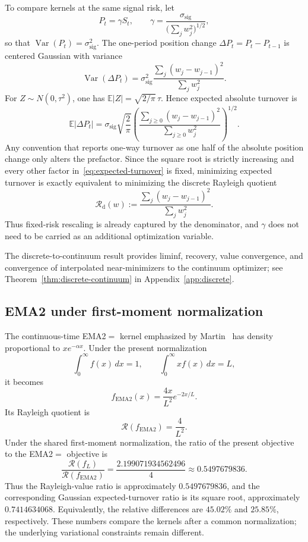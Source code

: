 \documentclass[11pt]{amsart}
\theoremstyle{definition}
\theoremstyle{remark}
\newcommand{\Rcal}{\mathcal R}
\begin{document}
To compare kernels at the same signal risk, let
\[
 P_t=\gamma S_t,
 \qquad
 \gamma=\frac{\sigma_{\mathrm{sig}}}
 {\bigl(\sum_jw_j^2\bigr)^{1/2}},
\]
so that $\operatorname{Var}(P_t)=\sigma_{\mathrm{sig}}^2$. The one-period
position change $\Delta P_t=P_t-P_{t-1}$ is centered Gaussian with variance
\[
 \operatorname{Var}(\Delta P_t)
 =\sigma_{\mathrm{sig}}^2
 \frac{\sum_j(w_j-w_{j-1})^2}{\sum_jw_j^2}.
\]
For $Z\sim N(0,\tau^2)$, one has
$\mathbb E|Z|=\sqrt{2/\pi}\,\tau$. Hence expected absolute turnover is
\begin{equation}\label{eq:expected-turnover}
 \mathbb E|\Delta P_t|
 =\sigma_{\mathrm{sig}}\sqrt{\frac{2}{\pi}}
 \left(
 \frac{\sum_{j\geq0}(w_j-w_{j-1})^2}
      {\sum_{j\geq0}w_j^2}
 \right)^{1/2}.
\end{equation}
Any convention that reports one-way turnover as one half of the absolute
position change only alters the prefactor. Since the square root is strictly
increasing and every other factor in~\eqref{eq:expected-turnover} is fixed,
minimizing expected turnover is exactly equivalent to minimizing the discrete
Rayleigh quotient
\[
 \Rcal_{\mathrm d}(w)
 :=\frac{\sum_j(w_j-w_{j-1})^2}{\sum_jw_j^2}.
\]
Thus fixed-risk rescaling is already captured by the denominator, and $\gamma$
does not need to be carried as an additional optimization variable.

The discrete-to-continuum result provides liminf, recovery, value convergence,
and convergence of interpolated near-minimizers to the continuum optimizer; see
Theorem~\ref{thm:discrete-continuum} in Appendix~\ref{app:discrete}.

\subsection{EMA2 under first-moment normalization}
The continuous-time EMA2$=$ kernel emphasized by Martin~\cite{Martin2021} has
density proportional to $x e^{-\alpha x}$. Under the present normalization
\[
\int_0^\infty f(x)\,dx=1,
\qquad
\int_0^\infty x f(x)\,dx=L,
\]
it becomes
\[
 f_{\mathrm{EMA2}}(x)=\frac{4x}{L^2}e^{-2x/L}.
\]
Its Rayleigh quotient is
\[
 \Rcal(f_{\mathrm{EMA2}})=\frac{4}{L^2}.
\]
Under the shared first-moment normalization, the ratio of the present objective
to the EMA2$=$ objective is
\[
 \frac{\Rcal(f_L)}{\Rcal(f_{\mathrm{EMA2}})}
 =\frac{2.199071934562496}{4}
 \approx0.5497679836.
\]
Thus the Rayleigh-value ratio is approximately $0.5497679836$, and the
corresponding Gaussian expected-turnover ratio is its square root, approximately
$0.7414634068$. Equivalently, the relative differences are $45.02\%$ and
$25.85\%$, respectively. These numbers compare the kernels after a common
normalization; the underlying variational constraints remain different.
\end{document}
